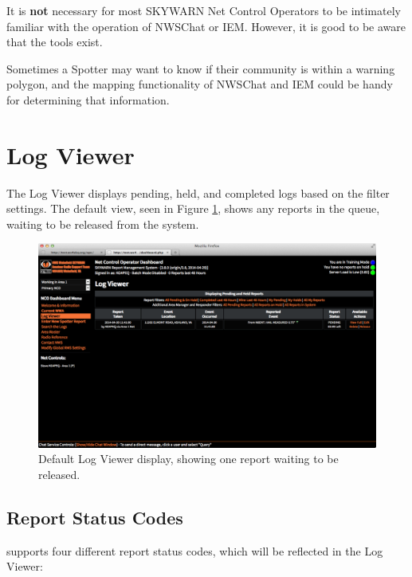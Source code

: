 \documentclass[pdflatex,letterpaper,twoside,12pt]{book}
\begin{document}
It is \textbf{not} necessary for most SKYWARN Net Control Operators to be intimately familiar with the operation of NWSChat or IEM.  However, it is good to be aware that the tools exist.

Sometimes a Spotter may want to know if their community is within a warning polygon, and the mapping functionality of NWSChat and IEM could be handy for determining that information.


\section{Log Viewer}\label{dash-log-viewer}

The Log Viewer displays pending, held, and completed logs based on the filter settings.  The default view, seen in Figure \ref{fig:dash-log-view}, shows any reports in the queue, waiting to be released from the system.

\begin{figure}[h]
  \centering
  \includegraphics[width=\textwidth,keepaspectratio=true]{img/dash-log-view-withreport}
  \caption{Default Log Viewer display, showing one report waiting to be released.\label{fig:dash-log-view}}
\end{figure}

\subsection{Report Status Codes}\label{dash-report-status-codes}

 supports four different report status codes, which will be reflected in the Log Viewer:
\end{document}
